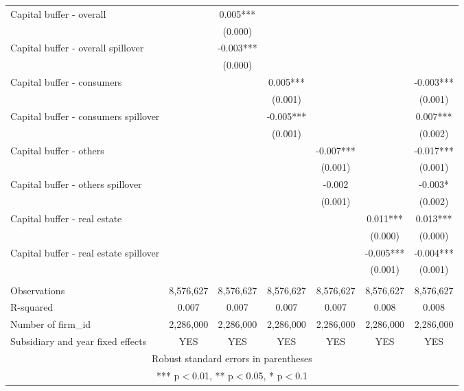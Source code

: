 \begin{tabular}{lcccccc}
Capital buffer - overall &  & 0.005*** &  &  &  &  \\
 &  & (0.000) &  &  &  &  \\
Capital buffer - overall spillover &  & -0.003*** &  &  &  &  \\
 &  & (0.000) &  &  &  &  \\
Capital buffer - consumers &  &  & 0.005*** &  &  & -0.003*** \\
 &  &  & (0.001) &  &  & (0.001) \\
Capital buffer - consumers spillover &  &  & -0.005*** &  &  & 0.007*** \\
 &  &  & (0.001) &  &  & (0.002) \\
Capital buffer - others &  &  &  & -0.007*** &  & -0.017*** \\
 &  &  &  & (0.001) &  & (0.001) \\
Capital buffer - others spillover &  &  &  & -0.002 &  & -0.003* \\
 &  &  &  & (0.001) &  & (0.002) \\
Capital buffer - real estate &  &  &  &  & 0.011*** & 0.013*** \\
 &  &  &  &  & (0.000) & (0.000) \\
Capital buffer - real estate spillover &  &  &  &  & -0.005*** & -0.004*** \\
 &  &  &  &  & (0.001) & (0.001) \\
 &  &  &  &  &  &  \\
Observations & 8,576,627 & 8,576,627 & 8,576,627 & 8,576,627 & 8,576,627 & 8,576,627 \\
R-squared & 0.007 & 0.007 & 0.007 & 0.007 & 0.008 & 0.008 \\
Number of firm\_id & 2,286,000 & 2,286,000 & 2,286,000 & 2,286,000 & 2,286,000 & 2,286,000 \\
 Subsidiary and year fixed effects & YES & YES & YES & YES & YES & YES \\ \hline
\multicolumn{7}{c}{ Robust standard errors in parentheses} \\
\multicolumn{7}{c}{ *** p$<$0.01, ** p$<$0.05, * p$<$0.1} \\
\end{tabular}
